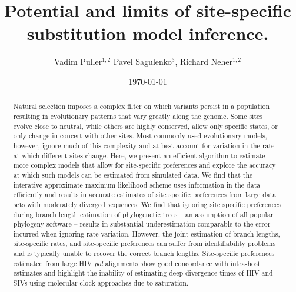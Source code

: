 \documentclass[aps,rmp,twocolumn]{revtex4}
\begin{document}
\title{Potential and limits of site-specific substitution model inference.}
\author{Vadim Puller$^{1,2}$ Pavel Sagulenko$^{3}$, Richard Neher$^{1,2}$}

\date{\today}

\begin{abstract}
Natural selection imposes a complex filter on which variants persist in a population resulting in evolutionary patterns that vary greatly along the genome.
Some sites evolve close to neutral, while others are highly conserved, allow only specific states, or only change in concert with other sites.
Most commonly used evolutionary models, however, ignore much of this complexity and at best account for variation in the rate at which different sites change.
Here, we present an efficient algorithm to estimate more complex models that allow for site-specific preferences and explore the accuracy at which such models can be estimated from simulated data.
We find that the interative approximate maximum likelihood scheme uses information in the data efficiently and results in accurate  estimates of site specific preferences from large data sets with moderately diverged sequences.
We find that ignoring site specific preferences during branch length estimation of phylogenetic trees -- an assumption of all popular phylogeny software -- results in substantial underestimation comparable to the error incurred when ignoring rate variation.
However, the joint estimation of branch lengths, site-specific rates, and site-specific preferences can suffer from identifiability problems and is typically unable to recover the correct branch lengths.
Site-specific preferences estimated from large HIV \emph{pol} alignments show good concordance with intra-host estimates and highlight the inability of estimating deep divergence times of HIV and SIVs using molecular clock approaches due to saturation.
\end{abstract}

\maketitle
\end{document}
